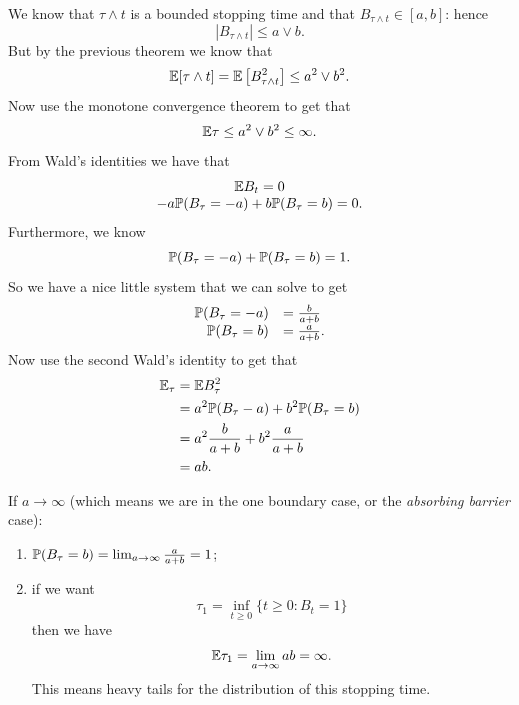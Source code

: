 \documentclass[12pt]{report}
\begin{document}
\begin{fancyproof}
	We know that $\tau\wedge t$ is a bounded stopping time and that $B_{\tau\wedge t}\in[a,b]$: hence
	\begin{equation*}
		|B_{\tau\wedge t}|\leq a\vee b.
	\end{equation*}
	But by the previous theorem we know that 
	\begin{equation*}
		\mathbb{E}[\tau\wedge t]=\mathbb{E}\left[B^{2}_{\tau\wedge t}\right]\leq a^{2}\vee b^{2}.
	\end{equation*}
	Now use the monotone convergence theorem to get that
	\begin{equation*}
		\mathbb{E}\tau\leq a^{2}\vee b^{2}\leq\infty.
	\end{equation*}
	From Wald's identities we have that 
	\begin{equation*}
		\begin{array}{c}
			\mathbb{E} B_{t}=0\\
			-a\mathbb{P}(B_{\tau}=-a)+b\mathbb{P}(B_{\tau}=b)=0.
		\end{array}
	\end{equation*}
	Furthermore, we know
	\begin{equation*}
		\mathbb{P}(B_{\tau}=-a)+\mathbb{P}(B_{\tau}=b)=1.
	\end{equation*}
	So we have a nice little system that we can solve to get
			\begin{equation*}
		\begin{array}{rl}
			\mathbb{P}(B_{\tau}=-a)&=\frac{b}{a+b}\\
			\mathbb{P}(B_{\tau}=b)&=\frac{a}{a+b}.
		\end{array}
	\end{equation*}
	Now use the second Wald's identity to get that 
	\begin{align*}
		\mathbb{E}_{\tau}&=\mathbb{E} B^{2}_{\tau}\\
		&=a^{2}\mathbb{P}(B_{\tau}-a)+b^{2}\mathbb{P}(B_{\tau}=b)\\
		&=a^{2}\frac{b}{a+b}+b^{2}\frac{a}{a+b}\\
		&=ab.
	\end{align*}
\end{fancyproof}
\begin{remark}
	If $a\to\infty$ (which means we are in the one boundary case, or the \textit{absorbing barrier} case):
	\begin{enumerate}
		\item $\mathbb{P}(B_{\tau}=b)=\lim_{a\to\infty}\frac{a}{a+b}=1$;
		\item if we want
		\begin{equation*}
			\tau_{1}=\inf_{t\geq 0}\{t\geq0:B_{t}=1\}
		\end{equation*}
		then we have 
		\begin{equation*}
			\mathbb{E}\tau_{1}=\lim_{a\to\infty}ab=\infty.
		\end{equation*}
		This means heavy tails for the distribution of this stopping time.
	\end{enumerate}
\end{remark}
\end{document}
